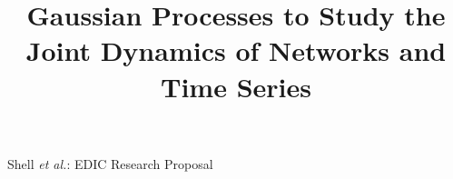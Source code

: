 


%
\title{Gaussian Processes to Study the Joint Dynamics of Networks and Time Series}
%
%
%
%
% 
%



%
{Shell \MakeLowercase{\textit{et al.}}: EDIC Research Proposal}
% 



